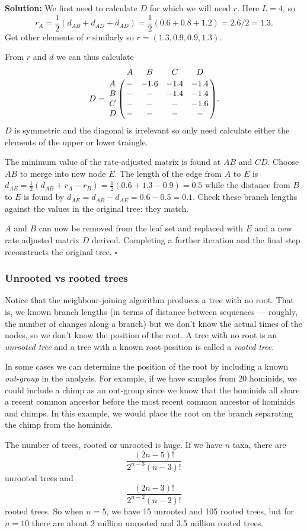 \documentclass[11pt]{article}
\newcommand{\sqend}{\hfill $\square$}
\begin{document}
{\bf Solution:} We first need to calculate $D$ for which we will need $r$.  Here $L = 4$, so  
\[ r_A = \frac 1 2 (d_{AB} + d_{AD}  + d_{AD}) = \frac 1 2 (0.6 + 0.8  + 1.2) = 2.6/2 = 1.3. \]
Get other elements of $r$ similarly so $r = (1.3, 0.9, 0.9, 1.3)$.  

From $r$ and $d$ we can thus calculate 
\[ D= \bordermatrix{~ & A & B & C & D \cr
A & - &-1.6 &-1.4 &-1.4 \cr
B &-  &- &-1.4 &-1.4 \cr
C &- &- & - &-1.6\cr
D &- &- &-& -\cr}.
\]
$D$ is symmetric and the diagonal is irrelevant so only need calculate either the elements of the upper or lower traingle.  

The minimum value of the rate-adjusted matrix is found at $AB$ and $CD$.  Choose $AB$ to merge into new node $E$.  The length of the edge from $A$ to $E$ is $d_{AE} = \frac12(d_{AB} + r_A - r_B) = \frac12(0.6 + 1.3 - 0.9 ) = 0.5$ while the distance from $B$ to $E$ is found by $d_{AE}  = d_{AB} - d_{AE} = 0.6 - 0.5 = 0.1$.  Check these branch lengths against the values in the original tree: they match.

$A$ and $B$ can now be removed from the leaf set and replaced with $E$ and a new rate adjusted matrix $D$ derived. Completing a further iteration and the final step reconstructs the original tree. \sqend


\subsubsection{Unrooted vs rooted trees}

Notice that the neighbour-joining algorithm produces a tree with no root.  That is, we known branch lengths (in terms of distance between sequences --- roughly, the number of changes along a branch) but we don't know the actual times of the nodes, so we don't know the position of the root.  A tree with no root is an  {\em unrooted tree} and a tree with a known root position is called a {\em rooted tree}.  

In some cases we can determine the position of the root by including a known {\em out-group} in the analysis.  For example, if we have samples from 20 hominids, we could include a chimp as an out-group since we know that the hominids all share a recent common ancestor before the most recent common ancestor of hominids and chimps.    In this example, we would place the root on the branch separating the chimp from the hominids.

The number of trees, rooted or unrooted is huge.  If we have $n$ taxa, there are 
\[ \frac{(2n-5)!}{2^{n-3}(n-3)!}\] 
unrooted trees and
\[ \frac{(2n-3)!}{2^{n-2}(n-2)!}\]
rooted trees. So when $n=5$, we have 15 unrooted and 105 rooted trees, but for $n=10$ there are about 2 million unrooted and 3.5 million rooted trees.
\end{document}
